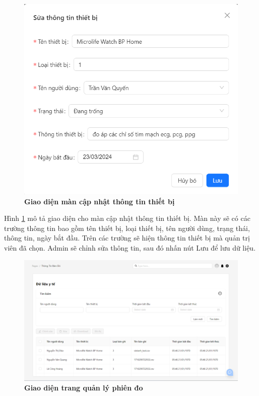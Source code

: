 \begin{figure}[H]
  \centering
  \includegraphics[scale=0.7]{Images/server/webUI/editDevice.png}
  \caption[Giao diện màn cập nhật thông tin thiết bị]{\bfseries \fontsize{12pt}{0pt}\selectfont Giao diện màn cập nhật thông tin thiết bị}
  \label{editDevice} %
\end{figure}

Hình \ref{editDevice} mô tả giao diện cho màn cập nhật thông tin thiết bị. Màn này sẽ có các trường thông tin bao gồm 
tên thiết bị, loại thiết bị, tên người dùng, trạng thái, thông tin, ngày bắt đầu. Trên các trường sẽ hiện thông tin thiết bị mà quản trị viên đã chọn. 
Admin sẽ chỉnh sửa thông tin, sau đó nhấn nút Lưu để lưu dữ liệu.

\begin{figure}[H]
  \centering
  \includegraphics[scale=0.5]{Images/server/webUI/recordTable.png}
  \caption[Giao diện trang quản lý phiên đo]{\bfseries \fontsize{12pt}{0pt}\selectfont Giao diện trang quản lý phiên đo}
  \label{recordTable} %
\end{figure}

